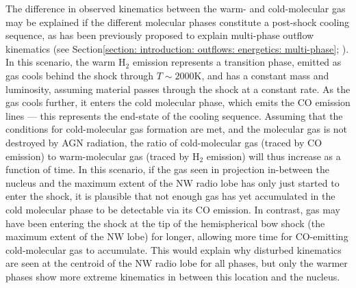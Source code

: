 The difference in observed kinematics between the warm- and cold-molecular gas may be explained if the different molecular phases constitute a post-shock cooling sequence, as has been previously proposed to explain multi-phase outflow kinematics (see Section\;\ref{section: introduction: outflows: energetics: multi-phase}; \citealt{VillarMartin1999, Zubovas2014, Tadhunter2014}). In this scenario, the warm H$_2$ emission represents a transition phase, emitted as gas cools behind the shock through $T\sim2000$\;K, and has a constant mass and luminosity, assuming material passes through the shock at a constant rate. As the gas cools further, it enters the cold molecular phase, which emits the CO emission lines --- this represents the end-state of the cooling sequence. Assuming that the conditions for cold-molecular gas formation are met, and the molecular gas is not destroyed by AGN radiation, the ratio of cold-molecular gas (traced by CO emission) to warm-molecular gas (traced by H$_2$ emission) will thus increase as a function of time. In this scenario, if the gas seen in projection in-between the nucleus and the maximum extent of the NW radio lobe has only just started to enter the shock, it is plausible that not enough gas has yet accumulated in the cold molecular phase to be detectable via its CO emission. In contrast, gas may have been entering the shock at the tip of the hemispherical bow shock (the maximum extent of the NW lobe) for longer, allowing more time for CO-emitting cold-molecular gas to accumulate. This would explain why disturbed kinematics are seen at the centroid of the NW radio lobe for all phases, but only the warmer phases show more extreme kinematics in between this location and the nucleus.



